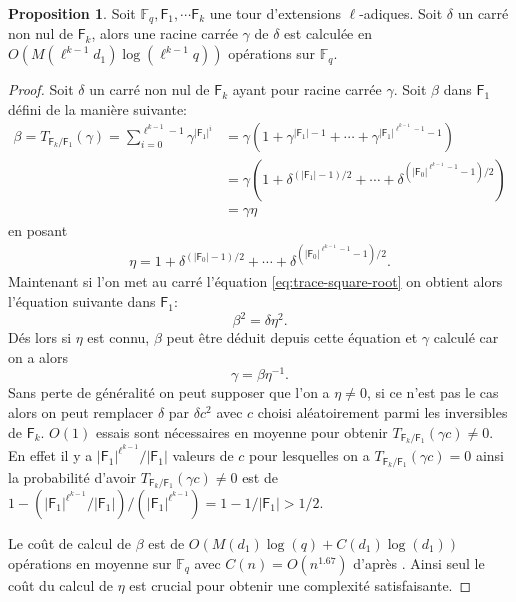 \documentclass[10pt,a4paper]{book}
\theoremstyle{plain}
\theoremstyle{definition}
\theoremstyle{definition}
\theoremstyle{definition}
\newtheorem{prop}[thm]{Proposition}
\theoremstyle{definition}
\theoremstyle{remark}
\theoremstyle{remark}
\theoremstyle{definition}
\begin{document}
\begin{prop}
Soit $\mathbb{F}_q, \mathsf{F}_1, \cdots \mathsf{F}_k$ une tour d'extensions $\ell$-adiques. Soit $\delta$ un carré non nul de $\mathsf{F}_k$, alors une racine carrée $\gamma$ de $\delta$ est calculée en $O(M(\ell^{k-1}d_1)\log(\ell^{k-1}q))$ opérations sur $\mathbb{F}_q$.
\end{prop}

\begin{proof}
Soit $\delta$ un carré non nul de $\mathsf{F}_k$ ayant pour racine carrée $\gamma$. Soit $\beta$ dans $\mathsf{F}_1$ défini de la manière suivante:
\begin{align}
\label{eq:trace-square-root}
\beta=T_{\mathsf{F}_k/\mathsf{F}_1}(\gamma)=\sum_{i=0}^{\ell^{k-1}-1}\gamma^{|\mathsf{F}_1|^i}&=\gamma(1+\gamma^{|\mathsf{F}_1|-1}+\cdots+ \gamma^{|\mathsf{F}_1|^{\ell^{k-1}-1}-1} ) \\
&=\gamma(1+\delta^{(|\mathsf{F}_1|-1)/2}+\cdots+ \delta^{(|\mathsf{F}_0|^{\ell^{k-1}-1}-1)/2}) \\
&=\gamma \eta
\end{align}
en posant 
\begin{align*}
\eta=1+\delta^{(|\mathsf{F}_0|-1)/2}+\cdots+ \delta^{(|\mathsf{F}_0|^{\ell^{k-1}-1}-1)/2}.
\end{align*}
Maintenant si l'on met au carré l'équation \eqref{eq:trace-square-root} on obtient alors l'équation suivante dans $\mathsf{F}_1$: 
\begin{equation*}
\beta^2=\delta \eta^2. 
\end{equation*}
Dés lors si $\eta$ est connu, $\beta$ peut être déduit depuis cette équation et $\gamma$ calculé car on a alors
\begin{equation*}
 \gamma=\beta \eta^{-1}.
\end{equation*}
Sans perte de généralité on peut supposer que l'on a $\eta \neq 0$, si ce n'est pas le cas alors on peut remplacer $\delta$ par $\delta c^2$ avec $c$ choisi aléatoirement parmi les inversibles de $\mathsf{F}_k$.
$O(1)$ essais sont nécessaires en moyenne pour obtenir $T_{\mathsf{F}_k/\mathsf{F}_1}(\gamma c) \neq 0$. En effet il y a $|\mathsf{F}_1|^{\ell^{k-1}}/|\mathsf{F}_1|$ valeurs de $c$ pour lesquelles on a $T_{\mathsf{F}_k/\mathsf{F}_1}(\gamma c) = 0$ ainsi la probabilité d'avoir $T_{\mathsf{F}_k/\mathsf{F}_1}(\gamma c) \neq 0$ est de $1-(|\mathsf{F}_1|^{\ell^{k-1}}/|\mathsf{F}_1|)/(|\mathsf{F}_1|^{\ell^{k-1}})=1-1/|\mathsf{F}_1|>1/2$.

Le coût de calcul de $\beta$ est de $O(M(d_1)\log(q)+C(d_1)\log(d_1))$ opérations en moyenne sur $\mathbb{F}_q$ avec $C(n)=O(n^{1.67})$ d'après \cite{Doliskani-Schost14}. Ainsi seul le coût du calcul de $\eta$ est crucial pour obtenir une complexité satisfaisante.


\end{proof}
\end{document}
